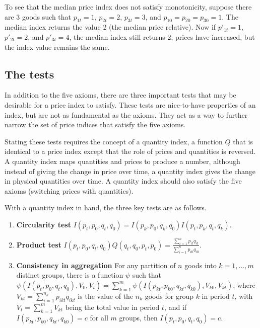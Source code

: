 \documentclass[]{article}
\begin{document}
To see that the median price index does not satisfy monotonicity, suppose there are 3 goods such that \(p_{1t} = 1\), \(p_{2t} = 2\), \(p_{3t} = 3\), and \(p_{10} = p_{20} = p_{30} = 1\). The median index returns the value 2 (the median price relative). Now if \(p'_{1t} = 1\), \(p'_{2t} = 2\), and \(p'_{3t} = 4\), the median index still returns 2; prices have increased, but the index value remains the same.

\hypertarget{the-tests}{%
\subsection{The tests}\label{the-tests}}

In addition to the five axioms, there are three important tests that may be desirable for a price index to satisfy. These tests are nice-to-have properties of an index, but are not as fundamental as the axioms. They act as a way to further narrow the set of price indices that satisfy the five axioms.

Stating these tests requires the concept of a quantity index, a function \(Q\) that is identical to a price index except that the role of prices and quantities is reversed. A quantity index maps quantities and prices to produce a number, although instead of giving the change in price over time, a quantity index gives the change in physical quantities over time. A quantity index should also satisfy the five axioms (switching prices with quantities).

With a quantity index in hand, the three key tests are as follows.

\begin{enumerate}
\def\labelenumi{\arabic{enumi}.}
\item
  \textbf{Circularity test} \(I(p_{t}, p_{0}, q_{t}, q_{0}) = I(p_{k}, p_{0}, q_{k}, q_{0}) I(p_{t}, p_{k}, q_{t}, q_{k})\).
\item
  \textbf{Product test} \(I(p_{t}, p_{0}, q_{t}, q_{0}) Q(q_{t}, q_{0}, p_{t}, p_{0}) = \frac{\sum_{i = 1}^{n} p_{it}q_{it}}{\sum_{i = 1}^{n} p_{i0}q_{i0}}\).
\item
  \textbf{Consistency in aggregation} For any partition of \(n\) goods into \(k = 1, \ldots, m\) distinct groups, there is a function \(\psi\) such that \(\psi(I(p_{t}, p_{0}, q_{t}, q_{0}), V_{0}, V_{t}) = \sum_{k = 1}^{m} \psi(I(p_{kt}, p_{k0}, q_{kt}, q_{k0}), V_{k0}, V_{kt})\), where \(V_{kt} = \sum_{i = 1}^{n_{k}} p_{ikt}q_{ikt}\) is the value of the \(n_{k}\) goods for group \(k\) in period \(t\), with \(V_{t} = \sum_{k = 1}^{m} V_{kt}\) being the total value in period \(t\), and if \(I(p_{kt}, p_{k0}, q_{kt}, q_{k0}) = c\) for all \(m\) groups, then \(I(p_{t}, p_{0}, q_{t}, q_{0}) = c\).
\end{enumerate}
\end{document}
